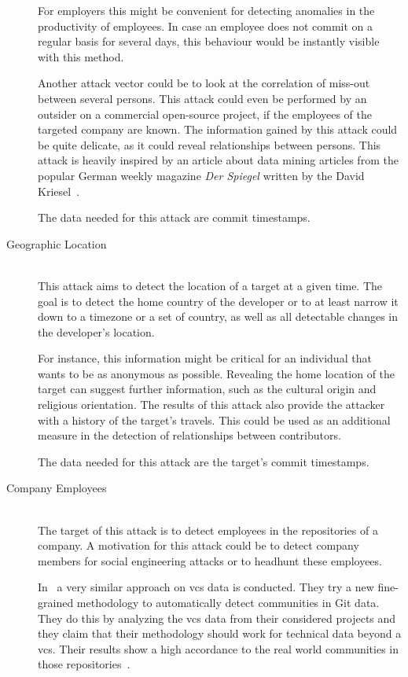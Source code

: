 \begin{description}
        For employers this might be convenient for detecting anomalies in the productivity of employees.
        In case an employee does not commit on a regular basis for several days, this behaviour would be instantly visible with this method.

        Another attack vector could be to look at the correlation of miss-out between several persons.
        This attack could even be performed by an outsider on a commercial open-source project, if the employees of the targeted company are known.
        The information gained by this attack could be quite delicate, as it could reveal relationships between persons.
        This attack is heavily inspired by an article about data mining articles from the popular German weekly magazine \emph{Der Spiegel} written by the David Kriesel~\cite{article:spiegel-mining}.

        The data needed for this attack are commit timestamps.

    \item[Geographic Location]~\label{attack:geographic-location} \hfill \\
        This attack aims to detect the location of a target at a given time.
        The goal is to detect the home country of the developer or to at least narrow it down to a timezone or a set of country, as well as all detectable changes in the developer's location.

        For instance, this information might be critical for an individual that wants to be as anonymous as possible.
        Revealing the home location of the target can suggest further information, such as the cultural origin and religious orientation.
        The results of this attack also provide the attacker with a history of the target's travels.
        This could be used as an additional measure in the detection of relationships between contributors.

        The data needed for this attack are the target's commit timestamps.

    \item[Company Employees]~\label{attack:company-employees} \hfill \\
        The target of this attack is to detect employees in the repositories of a company.
        A motivation for this attack could be to detect company members for social engineering attacks or to headhunt these employees.

        In~\cite{inproceedings:developer-networks} a very similar approach on \ac{vcs} data is conducted.
        They try a new fine-grained methodology to automatically detect communities in Git data.
        They do this by analyzing the \ac{vcs} data from their considered projects and they claim that their methodology should work for technical data beyond a \ac{vcs}.
        Their results show a high accordance to the real world communities in those repositories~\cite[p.~10]{inproceedings:developer-networks}.


\end{description}
